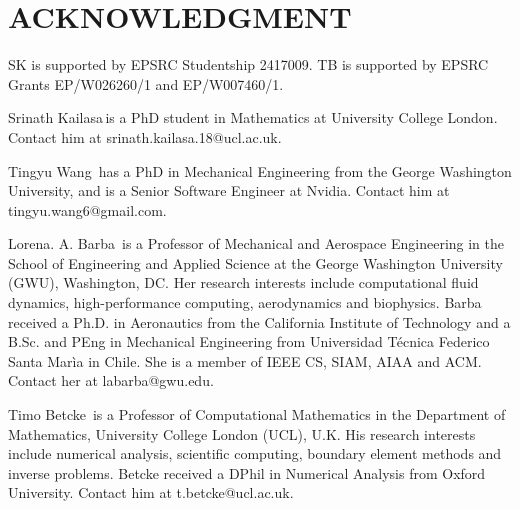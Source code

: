 \documentclass{IEEEcsmag}
\begin{document}
\section{ACKNOWLEDGMENT}

SK is supported by EPSRC Studentship 2417009. TB is supported by EPSRC Grants EP/W026260/1 and EP/W007460/1.





\begin{IEEEbiography}{Srinath Kailasa}{\,}is a PhD student in Mathematics at University College London. Contact him at srinath.kailasa.18@ucl.ac.uk.
\end{IEEEbiography}

\begin{IEEEbiography}{Tingyu Wang}{\,} has a PhD in Mechanical Engineering from the George Washington University, and is a Senior Software Engineer at Nvidia. Contact him at tingyu.wang6@gmail.com.
\end{IEEEbiography}

\begin{IEEEbiography}{Lorena. A. Barba}{\,} is a Professor of Mechanical and Aerospace Engineering in the School of Engineering and Applied Science at the George Washington University (GWU), Washington, DC. Her research interests include computational fluid dynamics, high-performance computing, aerodynamics and biophysics. Barba received a Ph.D. in Aeronautics from the California Institute of Technology and a B.Sc. and PEng in Mechanical Engineering from Universidad T\'ecnica Federico Santa Mar\`ia in Chile. She is a member of IEEE CS, SIAM, AIAA and ACM. Contact her at labarba@gwu.edu.
\end{IEEEbiography}

\begin{IEEEbiography}{Timo Betcke}{\,} is a Professor of Computational Mathematics in the Department of Mathematics, University College London (UCL), U.K. His research interests include numerical analysis, scientific computing, boundary element methods and inverse problems. Betcke received a DPhil in Numerical Analysis from Oxford University. Contact him at t.betcke@ucl.ac.uk.\end{IEEEbiography}
\end{document}

